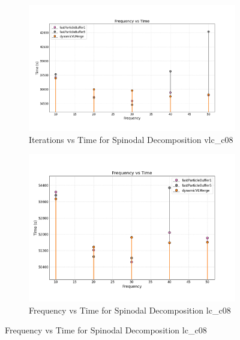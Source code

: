 \section{}
\begin{figure}[H]
\centering
\begin{subfigure}{\linewidth}
    \centering
    \includegraphics[width=\linewidth]{graphs/spinodalDecomposition/vlcc08.png}
    \caption{Iterations vs Time for Spinodal Decomposition vlc\_c08}
    \label{fig:fallingDrop}
\end{subfigure}

\begin{subfigure}{\linewidth}
    \centering
    \includegraphics[width=\linewidth]{graphs/spinodalDecomposition/lcc08.png}
    \caption{Frequency vs Time for Spinodal Decomposition lc\_c08}
    \label{fig:explodingLiquid}
\end{subfigure}

\label{fig:appendixGraphs}
\end{figure}



